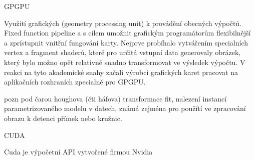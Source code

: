 \documentclass[10pt,draft,oneside]{fithesis2}
\begin{document}
% 
% 
% 



GPGPU

Využití grafických (geometry processing unit) k provádění obecných výpočtů. Fixed function pipeline a s cílem umožnit grafickým programátorům flexibilnější a zprístupnit vnitřní fungování karty. Nejprve probíhalo vytvářením specialních vertex a fragment shaderů, které pro určitá vstupní data generovaly obrázek, který bylo možno opět relativně snadno transformovat ve výsledek výpočtu. V reakci na tyto akademické snahy začali výrobci grafických karet pracovat na aplikačních rozhraních zpecialně pro GPGPU.

pozn pod čarou houghova (čti háfova) transformace fit, nalezení instancí parametrizovaného modelu v datech, známá zejména pro použítí ve zpracování obrazu k detenci přímek nebo kružnic.

CUDA

Cuda je výpočetní API vytvořené firmou Nvidia
\end{document}
